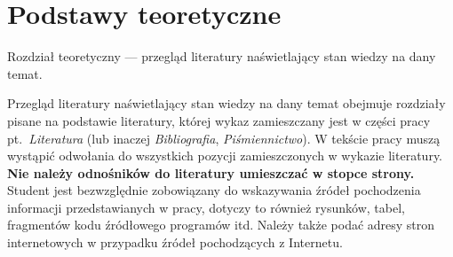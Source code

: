 
\chapter{Podstawy teoretyczne}

Rozdział teoretyczny --- przegląd literatury naświetlający stan wiedzy na dany temat.

Przegląd literatury naświetlający stan wiedzy na dany temat obejmuje rozdziały pisane na podstawie
literatury, której wykaz zamieszczany jest w części pracy pt.~\emph{Literatura} (lub inaczej \emph{Bibliografia},
\emph{Piśmiennictwo}). W tekście pracy muszą wystąpić odwołania do wszystkich pozycji zamieszczonych w
wykazie literatury. \textbf{Nie należy odnośników do literatury umieszczać w stopce strony.} Student jest
bezwzględnie zobowiązany do wskazywania źródeł pochodzenia informacji przedstawianych w pracy,
dotyczy to również rysunków, tabel, fragmentów kodu źródłowego programów itd. Należy także podać
adresy stron internetowych w przypadku źródeł pochodzących z Internetu.


